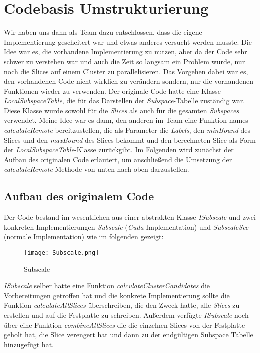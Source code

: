 
\section{Codebasis Umstrukturierung}

Wir haben uns dann als Team dazu entschlossen, dass die eigene Implementierung gescheitert war und etwas anderes versucht werden musste.
Die Idee war es, die vorhandene Implementierung zu nutzen, aber da der Code sehr schwer zu verstehen war und auch die Zeit so langsam ein 
Problem wurde, nur noch die Slices auf einem Cluster zu parallelisieren. Das Vorgehen dabei war es, den vorhandenen Code nicht wirklich zu 
verändern sondern, nur die vorhandenen Funktionen wieder zu verwenden. 
\newline 
\newline 
Der originale Code hatte eine Klasse \emph{LocalSubspaceTable}, die für das Darstellen der \emph{Subspace}-Tabelle zuständig war.
Diese Klasse wurde sowohl für die \emph{Slices} als auch für die gesamten \emph{Subspaces} verwendet. Meine Idee war es dann,
den anderen im Team eine Funktion names \emph{calculateRemote} bereitzustellen, die als Parameter die \emph{Labels}, den \emph{minBound} des Slices und den 
\emph{maxBound} des Slices bekommt und den berechneten Slice als Form der \emph{LocalSubspaceTable}-Klasse zurückgibt. 
\newline
\newline
Im Folgenden wird zunächst der Aufbau des originalen Code erläutert, um anschließend die Umsetzung der \emph{calculateRemote}-Methode
von unten nach oben darzustellen. 

\subsection{Aufbau des originalem Code}
Der Code bestand im wesentlichen aus einer abstrakten Klasse \emph{ISubscale} und zwei konkreten Implementierungen
\emph{Subscale} (\emph{Cuda}-Implementation) und \emph{SubscaleSec} (normale Implementation) wie im folgenden gezeigt:
\newpage
\begin{figure}[h]
    \centering
    \texttt{[image: Subscale.png]}
    \caption{Subscale}
    \label{img:subscale}
\end{figure}

\emph{ISubscale} selber hatte eine Funktion \emph{calculateClusterCandidates} die Vorbereitungen getroffen hat und die 
konkrete Implementierung sollte die Funktion \emph{calculateAllSlices} überschreiben, die den Zweck hatte, alle \emph{Slices}
zu erstellen und auf die Festplatte zu schreiben. Außerdem verfügte \emph{ISubscale} noch über eine Funktion \emph{combineAllSlices}
die die einzelnen Slices von der Festplatte geholt hat, die Slice verengert hat und dann zu der endgültigen Subspace Tabelle 
hinzugefügt hat.   

